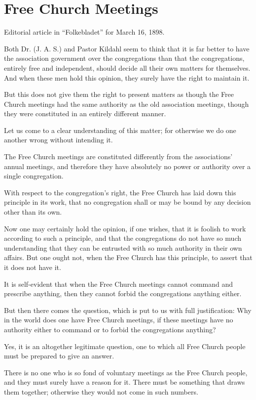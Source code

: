 
\section{Free Church Meetings}

Editorial article in “Folkebladet” for March 16, 1898.

Both Dr. (J. A. S.) and Pastor Kildahl seem to think that it is far better to have the association government over the congregations than that the congregations, entirely free and independent, should decide all their own matters for themselves. And when these men hold this opinion, they surely have the right to maintain it.

But this does not give them the right to present matters as though the Free Church meetings had the same authority as the old association meetings, though they were constituted in an entirely different manner.

Let us come to a clear understanding of this matter; for otherwise we do one another wrong without intending it.

The Free Church meetings are constituted differently from the associations’ annual meetings, and therefore they have absolutely no power or authority over a single congregation.

With respect to the congregation’s right, the Free Church has laid down this principle in its work, that no congregation shall or may be bound by any decision other than its own.

Now one may certainly hold the opinion, if one wishes, that it is foolish to work according to such a principle, and that the congregations do not have so much understanding that they can be entrusted with so much authority in their own affairs. But one ought not, when the Free Church has this principle, to assert that it does not have it.

It is self-evident that when the Free Church meetings cannot command and prescribe anything, then they cannot forbid the congregations anything either.

But then there comes the question, which is put to us with full justification: Why in the world does one have Free Church meetings, if these meetings have no authority either to command or to forbid the congregations anything?

Yes, it is an altogether legitimate question, one to which all Free Church people must be prepared to give an answer.

There is no one who is so fond of voluntary meetings as the Free Church people, and they must surely have a reason for it. There must be something that draws them together; otherwise they would not come in such numbers.


